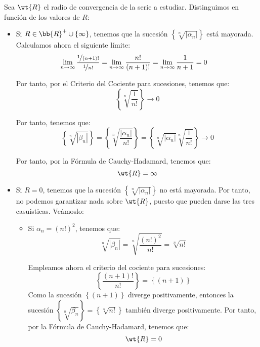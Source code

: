 \begin{ejercicio}
\begin{enumerate}
        Sea $\wt{R}$ el radio de convergencia de la serie a estudiar. Distinguimos en función de los valores de $R$:
        \begin{itemize}
            \item Si $R\in \bb{R}^+\cup \{\infty\}$, tenemos que la sucesión $\left\{\sqrt[n]{|\alpha_n|}\right\}$ está mayorada. Calculamos ahora el siguiente límite:
            \begin{align*}
                \lim_{n \to \infty} \dfrac{\nicefrac{1}{(n+1)!}}{\nicefrac{1}{n!}}
                &= \lim_{n \to \infty} \dfrac{n!}{(n+1)!}
                = \lim_{n \to \infty} \dfrac{1}{n+1} = 0
            \end{align*}

            Por tanto, por el Criterio del Cociente para sucesiones, tenemos que:
            \begin{equation*}
                \left\{\sqrt[n]{\dfrac{1}{n!}}\right\}\to 0
            \end{equation*}

            Por tanto, tenemos que:
            \begin{equation*}
                \left\{\sqrt[n]{|\beta_n|}\right\} = \left\{\sqrt[n]{\dfrac{|\alpha_n|}{n!}}\right\}
                = \left\{\sqrt[n]{|\alpha_n|}\sqrt[n]{\dfrac{1}{n!}}\right\}\to 0
            \end{equation*}

            Por tanto, por la Fórmula de Cauchy-Hadamard, tenemos que:
            \begin{equation*}
                \wt{R} = \infty
            \end{equation*}

            \item Si $R=0$, tenemos que la sucesión $\left\{\sqrt[n]{|\alpha_n|}\right\}$ no está mayorada. Por tanto, no podemos garantizar nada sobre $\wt{R}$, puesto que pueden darse las tres casuísticas. Veámoslo:
            \begin{itemize}
                \item Si $\alpha_n=(n!)^2$, tenemos que:
                \begin{equation*}
                    \sqrt[n]{|\beta_n|} = \sqrt[n]{\dfrac{(n!)^2}{n!}} = \sqrt[n]{n!}
                \end{equation*}

                Empleamos ahora el criterio del cociente para sucesiones:
                \begin{equation*}
                    \left\{\dfrac{(n+1)!}{n!}\right\}= \left\{(n+1)\right\}
                \end{equation*}
                Como la sucesión $\left\{(n+1)\right\}$ diverge positivamente, entonces la sucesión $\left\{\sqrt[n]{\beta_n}\right\}= \left\{\sqrt[n]{n!}\right\}$ también diverge positivamente. Por tanto, por la Fórmula de Cauchy-Hadamard, tenemos que:
                \begin{equation*}
                    \wt{R} = 0
                \end{equation*}


\end{itemize}
\end{itemize}
\end{enumerate}
\end{ejercicio}
